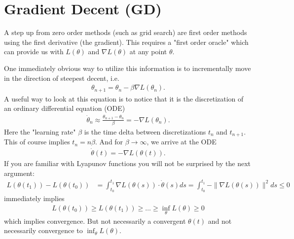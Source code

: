 
\newcommand{\identity}{\mathbb{I}}
\newcommand{\lbound}{\mu_l}
\newcommand{\ubound}{\mu_u}
\newcommand{\diag}{\text{diag}}
\newcommand{\rate}{\text{rate}}
\newcommand{\reals}{\mathbb{R}}
\newcommand{\firstOrderMethod}{\mathcal{M}}
\newcommand{\linSpan}{\text{span}}
\newcommand{\dimension}{d}
\newcommand{\loss}{L}
\newcommand{\weights}{\theta}
\newcommand{\lr}{\beta}

\chapter{Gradient Decent (GD)}

A step up from zero order methods (such as grid search) are first order methods
using the first derivative (the gradient). This requires a "first order oracle"
which can provide us with \(\loss(\weights)\) and \(\nabla \loss(\weights)\) at any point
\(\weights\).

One immediately obvious way to utilize this information is to
incrementally move in the direction of steepest decent, i.e.
%
\begin{align*}
	\weights_{n+1} = \weights_n - \lr\nabla \loss(\weights_n).
\end{align*}
%
A useful way to look at this equation is to notice that it is the
discretization of an ordinary differential equation (ODE)
%
\begin{align*}
	\dot{\weights}_n \approx \frac{\weights_{n+1} - \weights_n}{\lr}
	= - \nabla \loss(\weights_n).
\end{align*}
%
Here the "learning rate" \(\lr\) is the time delta between discretizations
\(t_n\) and \(t_{n+1}\). This of course implies \(t_n = n\lr\). And for
\(\lr\to\infty\), we arrive at the ODE
%
\begin{align}\label{eq: velocity is gradient}
	\dot{\weights}(t) = -\nabla \loss(\weights(t)).
\end{align}
%
If you are familiar with Lyapunov functions you will not be surprised by the next
argument:
%
\begin{align}\label{eq: gradient integral}
	\loss(\weights(t_1)) - \loss(\weights(t_0))
	&= \int_{t_0}^{t_1} \nabla \loss(\weights(s)) \cdot \dot{\weights}(s) ds
	= \int_{t_0}^{t_1} -\|\nabla \loss(\weights(s))\|^2 ds
	\le 0
\end{align}
%
immediately implies
\begin{align*}
	\loss(\weights(t_0)) \ge \loss(\weights(t_1)) \ge \dots \ge \inf_\weights \loss(\weights) \ge 0
\end{align*}
which implies convergence. But not necessarily a convergent \(\weights(t)\) and
not necessarily convergence to \(\inf_\weights \loss(\weights)\).

